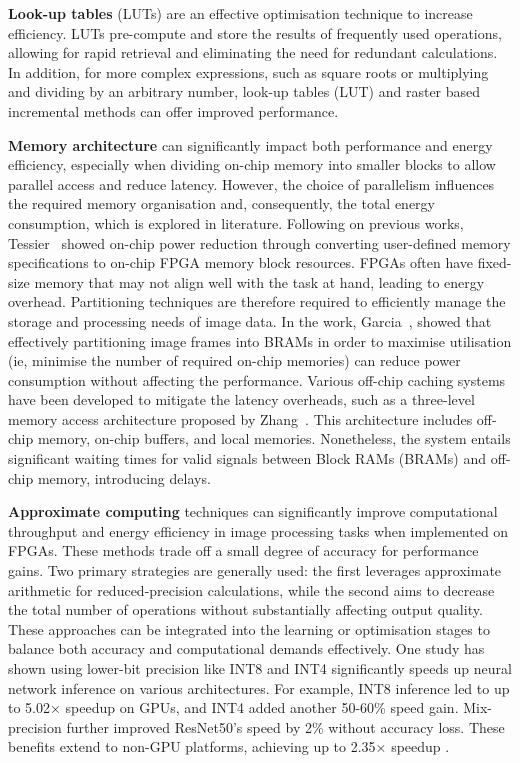 \textbf{Look-up tables} (LUTs) are an effective optimisation technique to increase efficiency\cite{RyuNisTos09,MesvAI01}. LUTs pre-compute and store the results of frequently used operations, allowing for rapid retrieval and eliminating the need for redundant calculations. In addition, for more complex expressions, such as square roots or multiplying and dividing by an arbitrary number, look-up tables (LUT) and raster based incremental methods can offer improved performance.

\textbf{Memory architecture }can significantly impact both performance and energy efficiency, especially when dividing on-chip memory into smaller blocks to allow parallel access and reduce latency. However, the choice of parallelism influences the required memory organisation and, consequently, the total energy consumption, which is explored in literature\cite{KadLakDav16,KadLak15}. Following on previous works, Tessier~\etal\cite{TessBetzNet07} showed on-chip power reduction through converting user-defined memory specifications to on-chip FPGA memory block resources. FPGAs often have fixed-size memory that may not align well with the task at hand, leading to energy overhead. Partitioning techniques are therefore required to efficiently manage the storage and processing needs of image data. In the work, Garcia~\etal\cite{GarBhoSte19}, showed that effectively partitioning image frames into BRAMs in order to maximise utilisation (ie, minimise the number of required on-chip memories) can reduce power consumption without affecting the performance. Various off-chip caching systems have been developed to mitigate the latency overheads, such as a three-level memory access architecture proposed by Zhang~\etal\cite{ZhaWeiChe19}. This architecture includes off-chip memory, on-chip buffers, and local memories. Nonetheless, the system entails significant waiting times for valid signals between Block RAMs (BRAMs) and off-chip memory, introducing delays.


\textbf{Approximate computing }techniques can significantly improve computational throughput and energy efficiency in image processing tasks when implemented on FPGAs\cite{Mit16}. These methods trade off a small degree of accuracy for performance gains. Two primary strategies are generally used: the first leverages approximate arithmetic for reduced-precision calculations, while the second aims to decrease the total number of operations without substantially affecting output quality. These approaches can be integrated into the learning or optimisation stages to balance both accuracy and computational demands effectively. One study has shown using lower-bit precision like INT8 and INT4 significantly speeds up neural network inference on various architectures. For example, INT8 inference led to up to 5.02× speedup on GPUs, and INT4 added another 50-60\% speed gain. Mix-precision further improved ResNet50's speed by 2\% without accuracy loss. These benefits extend to non-GPU platforms, achieving up to 2.35× speedup \cite{AmiSehzhe21}. 


